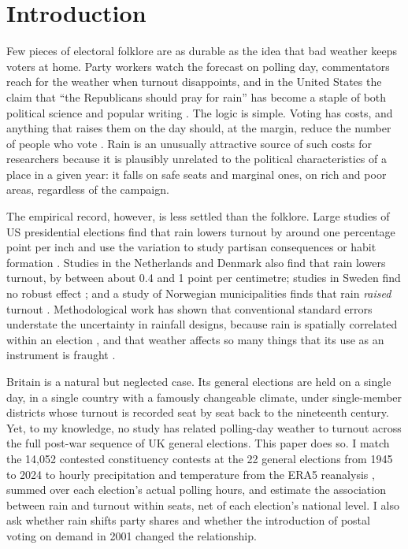 \documentclass[11pt,a4paper]{article}
\begin{document}
\section{Introduction}
Few pieces of electoral folklore are as durable as the idea that bad weather keeps voters at home. Party workers watch the forecast on polling day, commentators reach for the weather when turnout disappoints, and in the United States the claim that ``the Republicans should pray for rain'' has become a staple of both political science and popular writing \citep{gomez2007}. The logic is simple. Voting has costs, and anything that raises them on the day should, at the margin, reduce the number of people who vote \citep{downs1957,rikerordeshook1968}. Rain is an unusually attractive source of such costs for researchers because it is plausibly unrelated to the political characteristics of a place in a given year: it falls on safe seats and marginal ones, on rich and poor areas, regardless of the campaign.

The empirical record, however, is less settled than the folklore. Large studies of US presidential elections find that rain lowers turnout by around one percentage point per inch \citep{gomez2007} and use the variation to study partisan consequences \citep{hansfordgomez2010} or habit formation \citep{fujiwara2016}. Studies in the Netherlands \citep{eisinga2012turnout} and Denmark \citep{damsbo2023} also find that rain lowers turnout, by between about 0.4 and 1 point per centimetre; studies in Sweden find no robust effect \citep{persson2014}; and a study of Norwegian municipalities finds that rain \emph{raised} turnout \citep{lind2020}. Methodological work has shown that conventional standard errors understate the uncertainty in rainfall designs, because rain is spatially correlated within an election \citep{cooperman2017}, and that weather affects so many things that its use as an instrument is fraught \citep{mellon2025}.

Britain is a natural but neglected case. Its general elections are held on a single day, in a single country with a famously changeable climate, under single-member districts whose turnout is recorded seat by seat back to the nineteenth century. Yet, to my knowledge, no study has related polling-day weather to turnout across the full post-war sequence of UK general elections. This paper does so. I match the 14{,}052 contested constituency contests at the 22 general elections from 1945 to 2024 to hourly precipitation and temperature from the ERA5 reanalysis \citep{hersbach2020}, summed over each election's actual polling hours, and estimate the association between rain and turnout within seats, net of each election's national level. I also ask whether rain shifts party shares and whether the introduction of postal voting on demand in 2001 changed the relationship.
\end{document}
